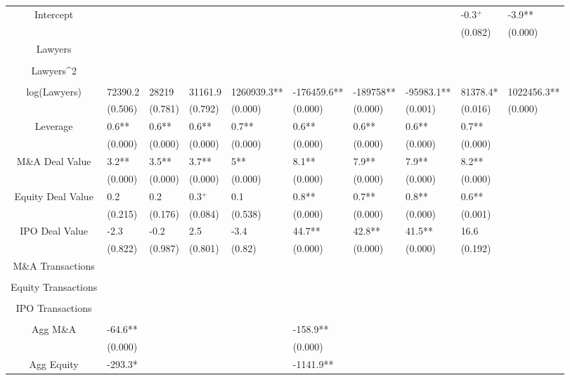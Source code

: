 \documentclass{article}
\begin{document}
\begin{table}[H]
\begin{tabular}{|clllllllll|}
Intercept &  &  &  &  &  &  &  & -0.3$^{+}$ & -3.9** \\ 
   &  &  &  &  &  &  &  & (0.082) & (0.000) \\ 
  Lawyers &  &  &  &  &  &  &  &  &  \\ 
   &  &  &  &  &  &  &  &  &  \\ 
  Lawyers^2 &  &  &  &  &  &  &  &  &  \\ 
   &  &  &  &  &  &  &  &  &  \\ 
  log(Lawyers) & 72390.2 & 28219 & 31161.9 & 1260939.3** & -176459.6** & -189758** & -95983.1** & 81378.4* & 1022456.3** \\ 
   & (0.506) & (0.781) & (0.792) & (0.000) & (0.000) & (0.000) & (0.001) & (0.016) & (0.000) \\ 
  Leverage & 0.6** & 0.6** & 0.6** & 0.7** & 0.6** & 0.6** & 0.6** & 0.7** &  \\ 
   & (0.000) & (0.000) & (0.000) & (0.000) & (0.000) & (0.000) & (0.000) & (0.000) &  \\ 
  M\&A Deal Value & 3.2** & 3.5** & 3.7** & 5** & 8.1** & 7.9** & 7.9** & 8.2** &  \\ 
   & (0.000) & (0.000) & (0.000) & (0.000) & (0.000) & (0.000) & (0.000) & (0.000) &  \\ 
  Equity Deal Value & 0.2 & 0.2 & 0.3$^{+}$ & 0.1 & 0.8** & 0.7** & 0.8** & 0.6** &  \\ 
   & (0.215) & (0.176) & (0.084) & (0.538) & (0.000) & (0.000) & (0.000) & (0.001) &  \\ 
  IPO Deal Value & -2.3 & -0.2 & 2.5 & -3.4 & 44.7** & 42.8** & 41.5** & 16.6 &  \\ 
   & (0.822) & (0.987) & (0.801) & (0.82) & (0.000) & (0.000) & (0.000) & (0.192) &  \\ 
  M\&A Transactions &  &  &  &  &  &  &  &  &  \\ 
   &  &  &  &  &  &  &  &  &  \\ 
  Equity Transactions &  &  &  &  &  &  &  &  &  \\ 
   &  &  &  &  &  &  &  &  &  \\ 
  IPO Transactions &  &  &  &  &  &  &  &  &  \\ 
   &  &  &  &  &  &  &  &  &  \\ 
  Agg M\&A & -64.6** &  &  &  & -158.9** &  &  &  &  \\ 
   & (0.000) &  &  &  & (0.000) &  &  &  &  \\ 
  Agg Equity & -293.3* &  &  &  & -1141.9** &  &  &  &  \\ 

\end{tabular}
\end{table}
\end{document}
